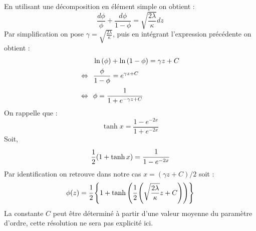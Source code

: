 En utilisant une décomposition en élément simple on obtient :
\begin{equation}
\frac{d\phi}{\phi} + \frac{d\phi}{1-\phi} = \sqrt{\frac{2\lambda}{\kappa}} dz
\label{solution_statio_plane}
\end{equation}
Par simplification on pose $ \displaystyle \gamma = \sqrt{\frac{2\lambda}{\kappa}}$, puis en intégrant l'expression précédente on obtient : 
\begin{align*}
	&\ln{(\phi)} + \ln{(1-\phi)}  = \gamma z + C \\
\Leftrightarrow \hspace{0.25cm}	&\frac{\phi}{1-\phi}= e^{\gamma z +C } \\
\Leftrightarrow \hspace{0.25cm}	&\phi = \cfrac{1}{1 + e^{-\gamma z +C}}
\end{align*}
On rappelle que : 
\begin{equation}
	\tanh x = \frac{1-e^{-2x}}{1+e^{-2x}}
\end{equation}
Soit,
\begin{equation}
	\frac{1}{2}{(1+\tanh x)} = \cfrac{1}{1-e^{-2x}}
\end{equation}
Par identification on retrouve dans notre cas $x = (\gamma z+ C)  /2$ soit  : 
\begin{equation}
	 \phi(z) = \cfrac{1}{2} \left\{ 1+\tanh \left(\cfrac{1}{2}\left(\sqrt{\frac{2\lambda}{\kappa}}z +C\right)\right)\right\}
 \end{equation}
La constante $C$ peut être déterminé à partir d'une valeur moyenne du paramètre d'ordre, cette résolution ne sera pas explicité ici.





